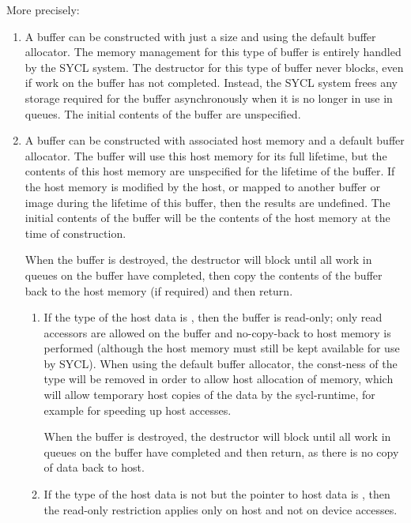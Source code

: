 More precisely:
\begin{enumerate}
  \item
    A buffer can be constructed with just a size and using the default
    buffer allocator.  The memory management for this type of buffer
    is entirely handled by the SYCL system. The destructor for this
    type of buffer never blocks, even if work on the buffer has not
    completed. Instead, the SYCL system frees any storage required
    for the buffer asynchronously when it is no longer in use in queues.
    The initial contents of the buffer are unspecified.

  \item
    A buffer can be constructed with associated host memory and a default
    buffer allocator. The buffer will use this host memory for its full lifetime, but the
    contents of this host memory are unspecified for the lifetime of the
    buffer. If the host memory is modified by the host, or mapped to
    another buffer or image during the lifetime of this buffer, then
    the results are undefined. The initial contents of the buffer will
    be the contents of the host memory at the time of construction.

    When the buffer is destroyed, the destructor will block until all
    work in queues on the buffer have completed, then copy the contents
    of the buffer back to the host memory (if required) and then
    return.

    \begin{enumerate}
    \item
    If the type of the host data is , then the buffer is
    read-only; only read accessors are allowed on the buffer and
    no-copy-back to host memory is performed (although the host memory
    must still be kept available for use by SYCL). When using the default
    buffer allocator, the const-ness of the type will be removed in order to
    allow host allocation of memory, which will allow temporary host copies
    of the data by the \gls{sycl-runtime}, for example for speeding up
    host accesses.

    When the buffer is destroyed, the destructor will block until all
    work in queues on the buffer have completed and then return, as there
    is no copy of data back to host.

    \item

      If the type of the host data is not  but the
      pointer to host data is , then the read-only
      restriction applies only on host and not on device accesses.


\end{enumerate}
\end{enumerate}
